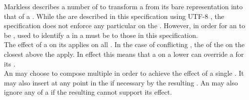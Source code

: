 Markless describes a number of  to transform a  from its bare  representation into that of a . While the  are described in this specification using UTF-8 , the specification does not enforce any particular  on the . However, in order for an  to be ,  used to identify a  in a  must be  to those in this specification. \\

The effect of a  on its  applies on all . In the case of conflicting , the  of the  on the closest  above the  apply. In effect this means that a  on a lower  can override a  for its .  \\

An  may choose to compose multiple  in order to achieve the effect of a single . It may also insert  at any point in the  if necessary by the resulting . An  may also ignore any  of a  if the resulting cannot support its effect.


